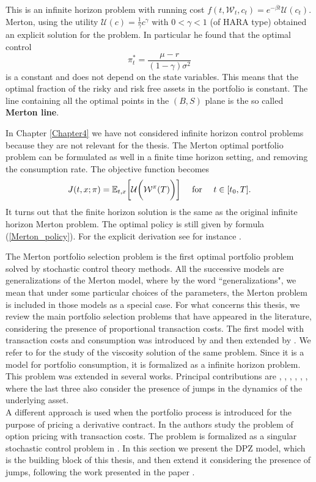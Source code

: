 This is an infinite horizon problem with running cost $f(t,\mathcal{W}_t,c_t) = e^{-\beta t} \mathcal{U}(c_t)$. 
Merton, using the utility $\mathcal{U}(c) = \frac{1}{\gamma} c^{\gamma}$ with $0<\gamma<1$ (of HARA type) obtained an explicit solution for the problem. In particular he found that 
the optimal control
\begin{equation}\label{Merton_policy}
  \pi^*_t = \frac{\mu-r}{(1-\gamma)\sigma^2}
\end{equation}
is a constant and does not depend on the state variables.  
This means that the optimal fraction of the risky and risk free assets in the portfolio is constant.
The line containing all the optimal points in the $(B,S)$ plane is the so called \textbf{Merton line}.

In Chapter \ref{Chapter4} we have not considered infinite horizon control problems because they are not relevant for the thesis.
The Merton optimal portfolio problem can be formulated as well in a finite time horizon setting, and removing the consumption rate. The objective function becomes
\begin{equation}\label{Merton_problem2}
 J(t,x;\pi) = \mathbb{E}_{t,x} \biggl[ \mathcal{U}\biggl( \mathcal{W}^{\pi}(T) \biggr) \biggr] \quad \mbox{ for } \quad t \in [t_0,T].
\end{equation}
It turns out that the finite horizon solution is the same as the original infinite horizon Merton problem. The optimal policy is still given by formula (\ref{Merton_policy}).
For the explicit derivation see for instance \cite{Pham}.

\noindent
The Merton portfolio selection problem is the first optimal portfolio problem solved by stochastic control theory methods. 
All the successive models are generalizations of the Merton model, where by 
the word ``generalizations", we mean that under some particular choices of the parameters, the Merton problem is included in those models as a special case.
For what concerns this thesis, we review the main portfolio selection problems that have appeared in the literature, considering the presence of proportional transaction costs.
The first model with transaction costs and consumption was introduced by \cite{Co86} and then extended by \cite{DaNo90}. We refer to \cite{ShSo94}
for the study of the viscosity solution of the same problem. Since it is a model for portfolio consumption, it is formalized as a infinite horizon problem.
This problem was extended in several works. Principal contributions are 
\cite{DaYi09}, \cite{Dai10}, \cite{LiuLo02}, \cite{LiuLo07}, \cite{BKR01}, \cite{OkSu01}, where the last three also consider the presence of jumps in the dynamics of the underlying
asset.\\
A different approach is used when the portfolio process is introduced for the purpose of pricing a derivative contract.
In \cite{HoNe89} the authors study the problem of option pricing with transaction costs. The problem is formalized as a singular stochastic control problem in \cite{DaPaZa93}.
In this section we present the DPZ model, which is the building block of this thesis, and then extend it considering the presence of jumps, following the work presented in the paper
\cite{Canta}.



